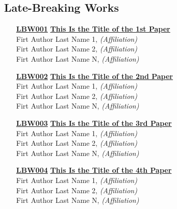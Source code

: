 \subsection{Late-Breaking Works}
\begin{enumerate}
\item[\href{https://doi.org/10.1145/1122445.1122456}{\textbf{LBW001}}]
\href{https://doi.org/10.1145/1122445.1122456}{\textbf{This Is the Title of the 1st Paper}}\\
Firt Author Last Name 1, \emph{(Affiliation)}\\
Firt Author Last Name 2, \emph{(Affiliation)}\\
Firt Author Last Name N, \emph{(Affiliation)}\\

\item[\href{https://doi.org/10.1145/1122445.1122456}{\textbf{LBW002}}]
\href{https://doi.org/10.1145/1122445.1122456}{\textbf{This Is the Title of the 2nd Paper}}\\
Firt Author Last Name 1, \emph{(Affiliation)}\\
Firt Author Last Name 2, \emph{(Affiliation)}\\
Firt Author Last Name N, \emph{(Affiliation)}\\

\item[\href{https://doi.org/10.1145/1122445.1122456}{\textbf{LBW003}}]
\href{https://doi.org/10.1145/1122445.1122456}{\textbf{This Is the Title of the 3rd Paper}}\\
Firt Author Last Name 1, \emph{(Affiliation)}\\
Firt Author Last Name 2, \emph{(Affiliation)}\\
Firt Author Last Name N, \emph{(Affiliation)}\\

\item[\href{https://doi.org/10.1145/1122445.1122456}{\textbf{LBW004}}]
\href{https://doi.org/10.1145/1122445.1122456}{\textbf{This Is the Title of the 4th Paper}}\\
Firt Author Last Name 1, \emph{(Affiliation)}\\
Firt Author Last Name 2, \emph{(Affiliation)}\\
Firt Author Last Name N, \emph{(Affiliation)}\\
\end{enumerate}


